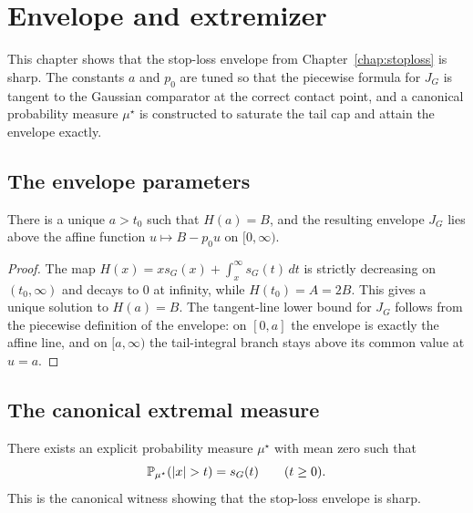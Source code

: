 \chapter{Envelope and extremizer}\label{chap:envelope}

This chapter shows that the stop-loss envelope from Chapter~\ref{chap:stoploss}
is sharp.
The constants $a$ and $p_0$ are tuned so that the piecewise formula for
$J_G$ is tangent to the Gaussian comparator at the correct contact point, and a
canonical probability measure $\mu^\star$ is constructed to saturate the tail cap
and attain the envelope exactly.

\section{The envelope parameters}

\begin{lemma}\label{lem:a-parameter}
\leanok
{}\leanok
There is a unique $a > t_0$ such that $H(a)=B$, and the resulting envelope
$J_G$ lies above the affine function $u \mapsto B - p_0 u$ on $[0,\infty)$.
\end{lemma}

\begin{proof}\leanok
The map $H(x)=x s_G(x)+\int_x^\infty s_G(t)\,dt$ is strictly decreasing on
$(t_0,\infty)$ and decays to $0$ at infinity, while $H(t_0)=A=2B$.
This gives a unique solution to $H(a)=B$. The tangent-line lower bound for
$J_G$ follows from the piecewise definition of the envelope:
on $[0,a]$ the envelope is exactly the affine line, and on $[a,\infty)$ the
tail-integral branch stays above its common value at $u=a$.
\end{proof}

\section{The canonical extremal measure}

\begin{theorem}\label{thm:extremizer-tail}
\leanok
{}\leanok
{}\leanok
{}\leanok
There exists an explicit probability measure $\mu^\star$ with mean zero such
that
\[
  \Prb_{\mu^\star}(|x|>t) = s_G(t) \qquad (t \ge 0).
\]
This is the canonical witness showing that the stop-loss envelope is sharp.
\end{theorem}

